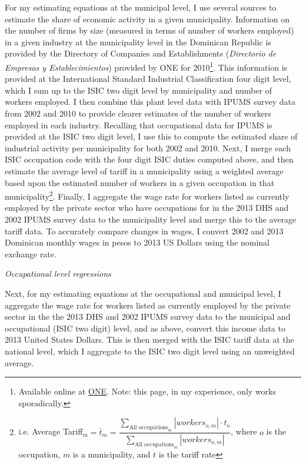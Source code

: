 For my estimating equations at the municipal level,
I use several sources to estimate the share of economic activity in a given municipality.
Information on the number of firms by size (measured in terms of
number of workers employed) in a given industry at the 
municipality level in the Dominican Republic is provided by the 
Directory of Companies and Establishments (\textit{Directorio de Empresas y Establecimientos})
provided by ONE for 2010\footnote{Available online at \href{http://www.one.gov.do/recursos-automatizados/
323/directorio-de-empresas-y-establecimientos/}{ONE}. Note: this page, in my experience,
only works sporadically.}. This information is provided
at the International Standard Industrial Classification four digit level, which I sum
up to the ISIC two digit level by municipality and number of workers employed.
I then combine this plant level data with IPUMS survey data from 2002 and 2010 to provide 
clearer estimates of the number of workers employed in each industry. Recalling that occupational data
for IPUMS is provided at the ISIC two digit level, I use this to compute the estimated
share of industrial activity per municipality for both 2002 and 2010.
Next, I merge each ISIC occupation code with the four digit ISIC duties computed above, 
and then estimate the average level of tariff in a municipality using a weighted average
based upon the estimated number of workers in a given occupation in that 
municipality\footnote{i.e. Average Tariff$_m = \bar{t}_m =
\dfrac{\displaystyle \sum_{\text{All occupations}_m} |workers_{o,m}| \cdot t_o}
{\displaystyle \sum_{\text{All occupations}_m} |workers_{o,m}|}$, where $o$ is the 
occupation, $m$ is a municipality, and $t$ is the tariff rate}. Finally, I aggregate
the wage rate for workers listed as currently employed by the private sector who 
have occupations for in the 2013 DHS 
and 2002 IPUMS survey data to the municipality level and merge
this to the average tariff data. 
To accurately compare changes in wages, I convert 2002 
and 2013 Dominican monthly wages in pesos to 2013 US Dollars using the nominal exchange rate.

\textit{Occupational level regressions}

Next, for my estimating equations at the occupational 
and municipal level, I aggregate the wage rate for workers listed as currently employed 
by the private sector in the the 2013 DHS and 2002 IPUMS survey data to the 
municipal and occupational (ISIC two digit) level, and as above, 
convert this income data to 2013 United States Dollars. 
This is then merged with the ISIC tariff data at the national level, 
which I aggregate to the ISIC two digit level using an unweighted average. 